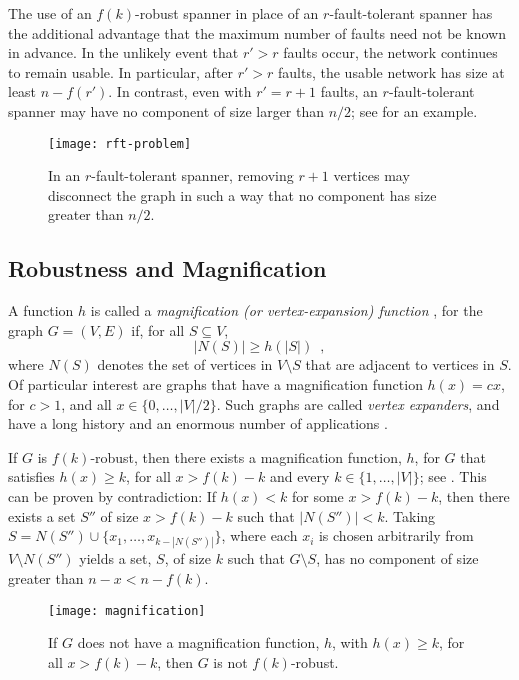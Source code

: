 \documentclass{patmorin}
\begin{document}
The use of an $f(k)$-robust spanner in place of an $r$-fault-tolerant
spanner has the additional advantage that the maximum number of faults
need not be known in advance.  In the unlikely event that $r'> r$
faults occur, the network continues to remain usable.  In particular,
after $r'>r$ faults, the usable network has size at least $n-f(r')$. In
contrast, even with $r'=r+1$ faults, an $r$-fault-tolerant spanner may
have no component of size larger than $n/2$; see 
for an example.

\begin{figure}
  \begin{center}
    \texttt{[image: rft-problem]}
  \end{center}
  \caption{In an $r$-fault-tolerant spanner, removing $r+1$ vertices may
  disconnect the graph in such a way that no component has size greater
  than $n/2$.}
\end{figure}

\subsection{Robustness and Magnification}

A function $h$ is called a \emph{magnification (or vertex-expansion)
function} \cite[Page~390]{kalai91}, for the graph $G=(V,E)$ if, for all
$S\subseteq V$,
\[
    |N(S)| \ge h(|S|) \enspace ,
\]
where $N(S)$ denotes the set of vertices in $V\setminus S$ that are
adjacent to vertices in $S$.  Of particular interest are graphs
that have a magnification function $h(x)=cx$, for $c>1$, and
all $x\in\{0,\ldots,|V|/2\}$.  Such graphs are called \emph{vertex
expanders}, and have a long history and an enormous number of applications
\cite{hlw06}.

If $G$ is $f(k)$-robust, then there exists a magnification function,
$h$, for $G$ that satisfies $h(x) \ge k$, for all $x> f(k)-k$ and
every $k\in\{1,\ldots,|V|\}$; see .  This can
be proven by contradiction: If $h(x) < k$ for some $x> f(k)-k$, then
there exists a set $S''$ of size $x>f(k)-k$ such that $|N(S'')|< k$.
Taking $S=N(S'')\cup\{x_1,\ldots,x_{k-|N(S'')|}\}$, where each $x_i$ is
chosen arbitrarily from $V\setminus N(S'')$ yields a set, $S$, of size
$k$ such that $G\setminus S$, has no component of size greater than $n-x
< n-f(k)$.

\begin{figure}
  \begin{center}
    \texttt{[image: magnification]}
  \end{center}
  \caption{If $G$ does not have a magnification function, $h$, with
  $h(x)\ge k$, for all $x> f(k)-k$, then $G$ is not $f(k)$-robust.}
\end{figure}
\end{document}
